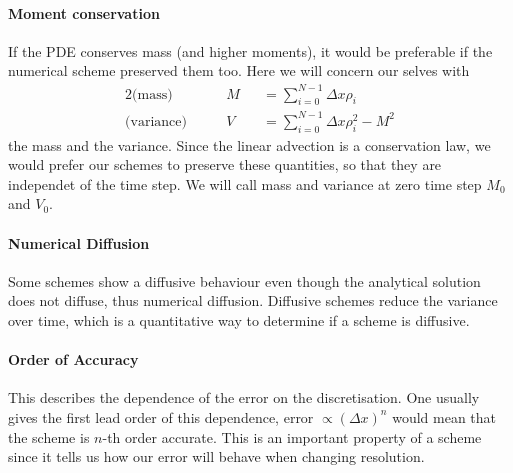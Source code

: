 \paragraph{Moment conservation}
If the PDE conserves mass (and higher moments), it would be preferable if the numerical scheme preserved them too. Here we will concern our selves with 
\begin{alignat}{2}
\text{(mass)}& \qquad M&&=\sum_{i=0}^{N-1} \Delta x\rho_i \\
\text{(variance)}&\qquad V&&=\sum_{i=0}^{N-1} \Delta x\rho_i ^2- M^2
\end{alignat}
the mass and the variance. Since the linear advection is a conservation law, we would prefer our schemes to preserve these quantities, so that they are independet of the time step.
We will call mass and variance at zero time step $M_0$ and $V_0$.
\paragraph{Numerical Diffusion}
Some schemes show a diffusive behaviour even though the analytical solution does not diffuse, thus numerical diffusion. Diffusive schemes reduce the variance over time, which is a quantitative way to determine if a scheme is diffusive.  
\paragraph{Order of Accuracy}
This describes the dependence of the error on the discretisation. One usually gives the first lead order of this dependence,  error $\propto (\Delta x)^n$ would mean that the scheme is $n$-th order accurate. This is an important property of a scheme since it tells us how our error will behave when changing resolution.